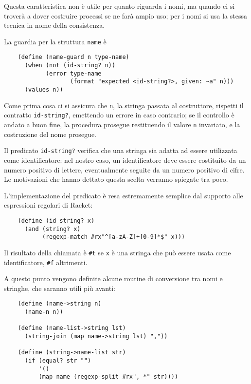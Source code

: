 Questa caratteristica non \`e utile per quanto riguarda i nomi, ma
quando ci si trover\`a a dover costruire processi se ne far\`a ampio
uso; per i nomi si usa la stessa tecnica in nome della consistenza.

La guardia per la struttura \lstinline{name} \`e

\begin{lstlisting}
    (define (name-guard n type-name)
      (when (not (id-string? n))
            (error type-name
                   (format "expected <id-string?>, given: ~a" n)))
      (values n))
\end{lstlisting}

Come prima cosa ci si assicura che \lstinline{n}, la stringa passata al
costruttore, rispetti il contratto \lstinline{id-string?}, emettendo un
errore in caso contrario; se il controllo \`e andato a buon fine, la
procedura prosegue restituendo il valore \lstinline{n} invariato, e la
costruzione del nome prosegue.

Il predicato \lstinline{id-string?} verifica che una stringa sia adatta
ad essere utilizzata come identificatore: nel nostro caso, un
identificatore deve essere costituito da un numero positivo di lettere,
eventualmente seguite da un numero positivo di cifre. Le motivazioni che
hanno dettato questa scelta verranno spiegate tra poco.

L'implementazione del predicato \`e resa estremamente semplice dal supporto
alle espressioni regolari di Racket:

\begin{lstlisting}
    (define (id-string? x)
      (and (string? x)
           (regexp-match #rx"^[a-zA-Z]+[0-9]*$" x)))
\end{lstlisting}

Il risultato della chiamata \`e \lstinline{#t} se \lstinline{x} \`e una
stringa che pu\`o essere usata come identificatore, \lstinline{#f}
altrimenti.

A questo punto vengono definite alcune routine di conversione tra nomi e
stringhe, che saranno utili pi\`u avanti:

\begin{lstlisting}
    (define (name->string n)
      (name-n n))

    (define (name-list->string lst)
      (string-join (map name->string lst) ","))

    (define (string->name-list str)
      (if (equal? str "")
          '()
          (map name (regexp-split #rx", *" str))))
\end{lstlisting}

